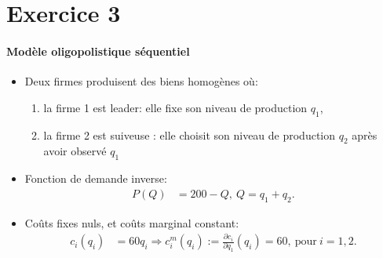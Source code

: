 \section{Exercice 3}
\frame{\sectionpage}
\begin{frame}[allowframebreaks]{\insertsection}
\framesubtitle{Modèle oligopolistique séquentiel}
\begin{itemize}
\item Deux firmes produisent des biens homogènes où: 
\begin{enumerate}[-]
\item la firme 1 est leader:  elle fixe son niveau de production $q_1$,
\item la firme 2 est suiveuse : elle choisit son niveau de production $q_2$ après avoir observé $q_1$
\end{enumerate}
\item Fonction de demande inverse: 
\begin{align}
    P(Q) &= 200 - Q, \ Q=q_1+q_2.
\label{eq1}
\end{align}
\item Coûts fixes nuls, et coûts marginal constant:
\begin{align}
    c_i(q_i) &= 60q_i \Rightarrow c^{m}_i(q_i) :=\frac{\partial c_i}{\partial q_1}(q_i) = 60, \ \text{pour} \ i= 1, 2.
    \label{eq2}
\end{align}
\end{itemize}
\end{frame}


